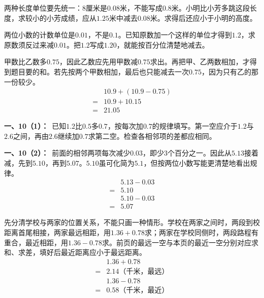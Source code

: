 \documentclass[multi=snippet,border=0pt]{standalone}
\newenvironment{snippet}[3]{\begin{minipage}{#1bp}\color{answerred}\fontsize{#2}{#3}\selectfont\raggedright}{\end{minipage}}
\begin{document}
\begin{snippet}{505}{11.5}{14}两种长度单位要先统一：8厘米是\(0.08\)米，不能写成\(0.8\)米。小明比小芳多跳这段长度，求较小的小芳成绩，应从\(1.25\)米中减去\(0.08\)米。求得后还应小于小明的高度。\end{snippet}
\begin{snippet}{505}{11.5}{14}两位小数的计数单位是\(0.01\)，不是\(0.1\)。已知原数加一个这样的单位才得到\(1.2\)，求原数须反过来减\(0.01\)。把\(1.2\)写成\(1.20\)，就能按百分位清楚地减去。\end{snippet}
\begin{snippet}{505}{11.5}{14}甲数比乙数多\(0.75\)，因此乙数应先用甲数减\(0.75\)求出。再把甲、乙两数相加，才得到题目要的和。若先按两个甲数相加，最后也只能减去一次\(0.75\)，因为只有乙的那一份较少。\[\begin{aligned}&10.9+(10.9-0.75)\\={}&10.9+10.15\\={}&21.05\end{aligned}\]\end{snippet}
\begin{snippet}{505}{11.5}{14}\textbf{一、10（1）：}\ 已知\(1.2\)比\(0.5\)多\(0.7\)，按每次加\(0.7\)的规律填写。第一空应介于\(1.2\)与\(2.6\)之间，再由\(2.6\)继续加\(0.7\)求第二空。检查各相邻项的差都应相同。\end{snippet}
\begin{snippet}{505}{11.5}{14}\textbf{一、10（2）：}\ 前面的相邻两项每次减少\(0.03\)，即少3个百分之一。因此从\(5.13\)接着减，先到\(5.10\)，再到\(5.07\)。\(5.10\)虽可化简为\(5.1\)，但按两位小数写能更清楚地看出规律。\[\begin{aligned}&5.13-0.03\\={}&5.10\\&5.10-0.03\\={}&5.07\end{aligned}\]\end{snippet}
\begin{snippet}{505}{11.5}{14}先分清学校与两家的位置关系，不能只画一种情形。学校在两家之间时，两段到校距离首尾相接，两家最远相距，用\(1.36+0.78\)求；两家在学校同侧时，两段路程有重合，最近相距，用\(1.36-0.78\)求。前页的最远一空与本页的最近一空分别对应求和、求差，填好后最近距离应小于最远距离。\[\begin{aligned}&1.36+0.78\\={}&2.14\text{（千米，最远）}\\&1.36-0.78\\={}&0.58\text{（千米，最近）}\end{aligned}\]\end{snippet}
\end{document}
